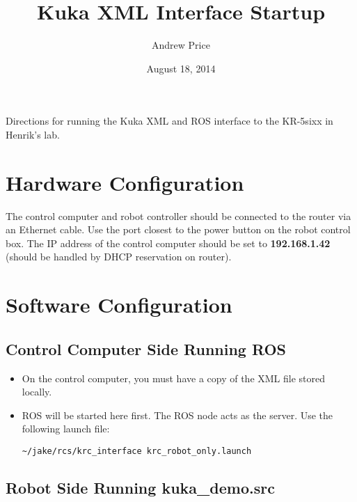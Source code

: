 \documentclass[12pt,letterpaper]{article}
\author{Andrew Price}
\title{Kuka XML Interface Startup}
\date{August 18, 2014}
\begin{document}
\maketitle

Directions for running the Kuka XML and ROS interface to the KR-5sixx in Henrik’s lab.

\section{Hardware Configuration}

The control computer and robot controller should be connected to the router via an Ethernet cable. Use the port closest to the power button on the robot control box. The IP address of the control computer should be set to \textbf{192.168.1.42} (should be handled by DHCP reservation on router).

\section{Software Configuration}

\subsection{Control Computer Side Running ROS}
\begin{itemize}

\item On the control computer, you must have a copy of the XML file stored locally. 

\item ROS will be started here first. The ROS node acts as the server. Use the following launch file:
\begin{lstlisting}
~/jake/rcs/krc_interface krc_robot_only.launch
\end{lstlisting}

\end{itemize}
\subsection{Robot Side Running kuka\_demo.src}
\end{document}
